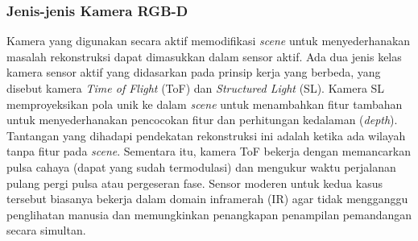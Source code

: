     \subsubsection{Jenis-jenis Kamera RGB-D}
    \label{subsec: jenis_rgb_d}
    Kamera yang digunakan secara aktif memodifikasi \textit{scene} untuk menyederhanakan masalah rekonstruksi dapat dimasukkan dalam sensor aktif. Ada dua jenis kelas kamera sensor aktif  yang didasarkan pada prinsip kerja yang berbeda, yang disebut kamera \textit{Time of Flight} (ToF) dan \textit{Structured Light} (SL)\cite{b7}.
    Kamera SL memproyeksikan pola unik ke dalam \textit{scene} untuk menambahkan fitur tambahan untuk menyederhanakan pencocokan fitur dan perhitungan kedalaman (\textit{depth}). Tantangan yang dihadapi pendekatan rekonstruksi ini adalah ketika ada wilayah tanpa fitur pada \textit{scene}. Sementara itu, kamera ToF bekerja dengan  memancarkan pulsa cahaya (dapat yang sudah termodulasi) dan mengukur waktu perjalanan pulang pergi pulsa atau pergeseran fase. Sensor moderen untuk kedua kasus tersebut biasanya bekerja dalam domain inframerah (IR) agar tidak mengganggu penglihatan manusia dan memungkinkan penangkapan penampilan pemandangan secara simultan.


